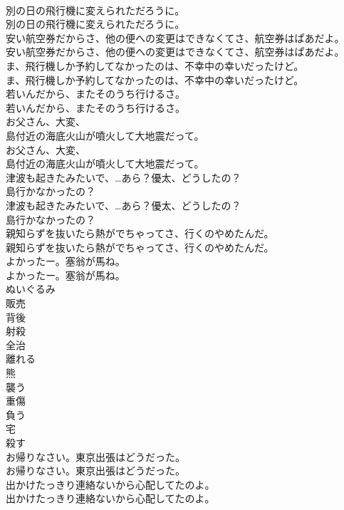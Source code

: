 \documentclass[8pt]{extreport}
\begin{document}
\begin{CJK}{UTF8}{min}
\\	別の日の飛行機に変えられただろうに。	
\\	別の日の飛行機に変えられただろうに。 
\\	安い航空券だからさ、他の便への変更はできなくてさ、航空券はぱあだよ。	
\\	安い航空券だからさ、他の便への変更はできなくてさ、航空券はぱあだよ。 
\\	ま、飛行機しか予約してなかったのは、不幸中の幸いだったけど。	
\\	ま、飛行機しか予約してなかったのは、不幸中の幸いだったけど。 
\\	若いんだから、またそのうち行けるさ。	
\\	若いんだから、またそのうち行けるさ。 
\\	お父さん、大変、
\\	島付近の海底火山が噴火して大地震だって。	
\\	お父さん、大変、
\\	島付近の海底火山が噴火して大地震だって。 
\\	津波も起きたみたいで、…あら？優太、どうしたの？
\\	島行かなかったの？	
\\	津波も起きたみたいで、…あら？優太、どうしたの？
\\	島行かなかったの？ 
\\	親知らずを抜いたら熱がでちゃってさ、行くのやめたんだ。	
\\	親知らずを抜いたら熱がでちゃってさ、行くのやめたんだ。 
\\	よかったー。塞翁が馬ね。	
\\	よかったー。塞翁が馬ね。 
\\	ぬいぐるみ
\\	販売
\\	背後
\\	射殺
\\	全治
\\	離れる
\\	熊
\\	襲う
\\	重傷
\\	負う
\\	宅
\\	殺す
\\	お帰りなさい。東京出張はどうだった。	
\\	お帰りなさい。東京出張はどうだった。 
\\	出かけたっきり連絡ないから心配してたのよ。	
\\	出かけたっきり連絡ないから心配してたのよ。 

\end{CJK}
\end{document}
